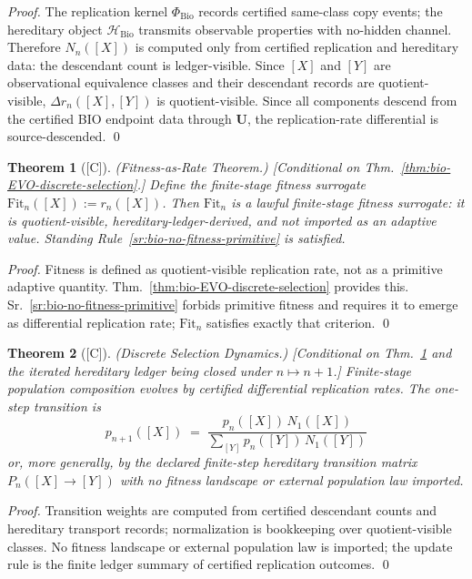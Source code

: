 \documentclass[12pt,oneside]{amsbook}
\theoremstyle{plain}
\newtheorem{theorem}{Theorem}[section]
\theoremstyle{definition}
\theoremstyle{remark}
\newcommand{\status}[1]{\textup{[#1]}}
\begin{document}
\begin{proof}
The replication kernel $\Phi_{\mathrm{Bio}}$ records certified
same-class copy events; the hereditary object $\mathcal{H}_{\mathrm{Bio}}$
transmits observable properties with no-hidden channel. Therefore
$N_n([X])$ is computed only from certified replication and hereditary
data: the descendant count is ledger-visible. Since $[X]$ and $[Y]$
are observational equivalence classes and their descendant records are
quotient-visible, $\Delta r_n([X],[Y])$ is quotient-visible. Since all
components descend from the certified BIO endpoint data through
$\mathbf{U}$, the replication-rate differential is source-descended.
\qed
\end{proof}

\begin{theorem}[\status{C}]\label{thm:bio-EVO-fitness-as-rate}
\textup{(Fitness-as-Rate Theorem.)}
\textup{[Conditional on Thm.~\ref{thm:bio-EVO-discrete-selection}.]}
Define the \emph{finite-stage fitness surrogate}
$\mathrm{Fit}_n([X]) := r_n([X])$.
Then $\mathrm{Fit}_n$ is a lawful finite-stage fitness surrogate: it is
quotient-visible, hereditary-ledger-derived, and not imported as an
adaptive value. Standing Rule~\ref{sr:bio-no-fitness-primitive}
is satisfied.
\end{theorem}

\begin{proof}
Fitness is defined as quotient-visible replication rate, not as a
primitive adaptive quantity. Thm.~\ref{thm:bio-EVO-discrete-selection}
provides this. Sr.~\ref{sr:bio-no-fitness-primitive} forbids primitive
fitness and requires it to emerge as differential replication rate;
$\mathrm{Fit}_n$ satisfies exactly that criterion.
\qed
\end{proof}

\begin{theorem}[\status{C}]\label{thm:bio-EVO-discrete-dynamics}
\textup{(Discrete Selection Dynamics.)}
\textup{[Conditional on Thm.~\ref{thm:bio-EVO-fitness-as-rate}
and the iterated hereditary ledger being closed under $n \mapsto n+1$.]}
Finite-stage population composition evolves by certified differential
replication rates. The one-step transition is
\[
 p_{n+1}([X]) \;=\;
 \frac{p_n([X])\,N_1([X])}{\sum_{[Y]} p_n([Y])\,N_1([Y])}
\]
or, more generally, by the declared finite-step hereditary transition
matrix $P_n([X] \to [Y])$ with no fitness landscape or external
population law imported.
\end{theorem}

\begin{proof}
Transition weights are computed from certified descendant counts and
hereditary transport records; normalization is bookkeeping over
quotient-visible classes. No fitness landscape or external
population law is imported; the update rule is the finite ledger
summary of certified replication outcomes.
\qed
\end{proof}
\end{document}
